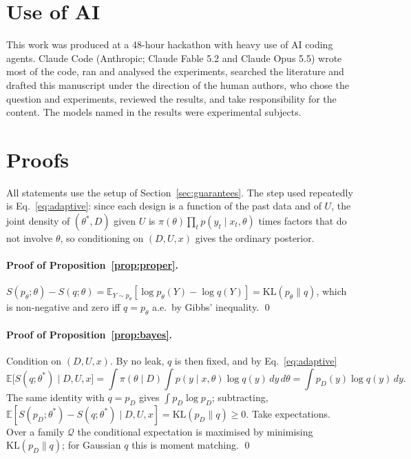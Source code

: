 \documentclass[10pt]{article}
\theoremstyle{definition}
\theoremstyle{remark}
\theoremstyle{plain}
\newcommand{\E}{\mathbb{E}}
\newcommand{\KL}{\mathrm{KL}}
\newcommand{\thetastar}{\theta^{*}}
\begin{document}
\section*{Use of AI}

This work was produced at a 48-hour hackathon with heavy use of AI coding agents. Claude Code
(Anthropic; Claude Fable 5.2 and Claude Opus 5.5) wrote most of the code, ran and analysed the
experiments, searched the literature and drafted this manuscript under the direction of the
human authors, who chose the question and experiments, reviewed the results, and take
responsibility for the content. The models named in the results were experimental subjects.




\appendix
\section{Proofs}
\label{app:proofs}

All statements use the setup of Section~\ref{sec:guarantees}. The step used repeatedly is
Eq.~\eqref{eq:adaptive}: since each design is a function of the past data and of $U$, the joint
density of $(\thetastar,D)$ given $U$ is $\pi(\theta)\prod_t p(y_t\mid x_t,\theta)$ times factors
that do not involve $\theta$, so conditioning on $(D,U,x)$ gives the ordinary posterior.

\paragraph{Proof of Proposition~\ref{prop:proper}.}
$S(p_\theta;\theta)-S(q;\theta)=\E_{Y\sim p_\theta}[\log p_\theta(Y)-\log q(Y)]=\KL(p_\theta\|q)$,
which is non-negative and zero iff $q=p_\theta$ a.e.\ by Gibbs' inequality. \qed

\paragraph{Proof of Proposition~\ref{prop:bayes}.}
Condition on $(D,U,x)$. By no leak, $q$ is then fixed, and by Eq.~\eqref{eq:adaptive}
\[
\E\big[S(q;\thetastar)\mid D,U,x\big]
=\int\pi(\theta\mid D)\int p(y\mid x,\theta)\log q(y)\,dy\,d\theta
=\int p_D(y)\log q(y)\,dy .
\]
The same identity with $q=p_D$ gives $\int p_D\log p_D$; subtracting,
$\E[S(p_D;\thetastar)-S(q;\thetastar)\mid D,U,x]=\KL(p_D\|q)\ge 0$. Take expectations. Over a family
$\mathcal Q$ the conditional expectation is maximised by minimising $\KL(p_D\|q)$; for Gaussian $q$
this is moment matching. \qed
\end{document}
